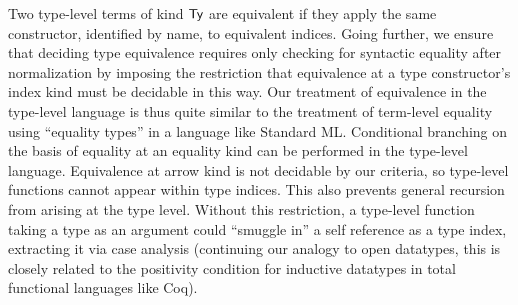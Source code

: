 \documentclass[10pt,preprint]{sigplanconf}
\begin{document}
{Two type-level terms of kind $\textsf{Ty}$ are equivalent if they apply the same constructor, identified by name, to equivalent indices. Going further, we ensure that deciding type equivalence requires only checking for syntactic equality after normalization by imposing the restriction that equivalence at a type constructor's index kind must be decidable in this way. Our treatment of equivalence in the type-level language is thus quite similar to the treatment of term-level equality using ``equality types'' in a language like Standard ML.
Conditional branching on the basis of equality at an equality kind can be performed in the type-level language. Equivalence at arrow kind is not decidable by our criteria, so type-level functions cannot appear within type indices. This also prevents general recursion from arising at the type level. Without this restriction, a type-level function taking a type as an argument could ``smuggle in'' a self reference as a type index, extracting it via case analysis (continuing our analogy to open datatypes, this is closely related to the positivity condition for inductive datatypes in total functional languages like Coq).%

}
\end{document}
